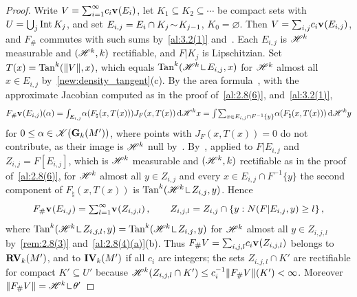 \begin{proof}
    Write $V = {\textstyle\sum_{i=1}^{\infty}} c_i \mathbf{v}_{}(E_i)$, let $K_1 \subseteq K_2 \subseteq \cdots$
    be compact sets with $U = {{\textstyle \bigcup}}_j \operatorname{Int} K_j$, and set $E_{i,j} = E_i \cap K_j \!\sim\!
    K_{j-1}$, $K_0 = \varnothing$. Then $V = {\textstyle\sum_{i,j}^{}} c_i \mathbf{v}_{}(E_{i,j})$, and $F_\#$
    commutes with such sums by~\ref{al:3.2(1)} and~\cite[2.4.7]{Federer1969}. Each $E_{i,j}$ is
    $\mathscr{H}^{k}$ measurable and $(\mathscr{H}^{k},k)$ rectifiable, and $F | K_j$ is Lipschitzian.
    Set $T(x) = \operatorname{Tan}^{k}(\|V\|,x)$, which equals $\Tan^{\vdim}(\HM^{\vdim} \restrict E_{i,j},x)$
    for $\mathscr{H}^{k}$ almost all $x \in E_{i,j}$ by~\ref{new:density_tangent}(c). By the area
    formula~\cite[3.2.20]{Federer1969}, with the approximate Jacobian computed as in the proof
    of~\ref{al:2.8(6)}, and~\ref{al:3.2(1)},
    \begin{displaymath}
        F_\# \mathbf{v}_{}(E_{i,j})(\alpha) = {\textstyle\int_{E_{i,j}}^{}} \alpha(F_\natural(x,T(x))) J_F(x,T(x))
        \,\mathrm{d} \mathscr{H}^{k} x = {\textstyle\int_{}^{}} {\textstyle\sum_{x \in E_{i,j} \cap F^{-1}\{y\}}^{}} \alpha(F_\natural(x,
        T(x))) \,\mathrm{d} \mathscr{H}^{k} y
    \end{displaymath}
    for $0 \le \alpha \in \mathscr{K}(\mathbf{G}_{k}(M'))$, where points with $J_F(x,T(x)) = 0$ do not
    contribute, as their image is $\mathscr{H}^{k}$ null by~\cite[3.2.20]{Federer1969}.
    By~\cite[3.2.22(1)]{Federer1969}, applied to $F | E_{i,j}$ and $Z_{i,j} = F[E_{i,j}]$, which
    is $\mathscr{H}^{k}$ measurable and $(\mathscr{H}^{k},k)$ rectifiable as in the proof
    of~\ref{al:2.8(6)}, for $\mathscr{H}^{k}$ almost all $y \in Z_{i,j}$ and every $x \in E_{i,j}
    \cap F^{-1}\{y\}$ the second component of $F_\natural(x,T(x))$ is $\Tan^{\vdim}(\HM^{\vdim}
    \restrict Z_{i,j}, y)$. Hence
    \begin{displaymath}
        F_\# \mathbf{v}_{}(E_{i,j}) = {\textstyle\sum_{l=1}^{\infty}} \mathbf{v}_{}(Z_{i,j,l}) \,, \qquad Z_{i,j,l} =
        Z_{i,j} \cap \{ y : N(F | E_{i,j}, y) \ge l \} \,,
    \end{displaymath}
    where $\Tan^{\vdim}(\HM^{\vdim} \restrict Z_{i,j,l}, y) = \Tan^{\vdim}(\HM^{\vdim} \restrict
    Z_{i,j}, y)$ for $\mathscr{H}^{k}$ almost all $y \in Z_{i,j,l}$ by~\ref{rem:2.8(3)}
    and~\ref{al:2.8(4)(a)}(b). Thus $F_\# V = {\textstyle\sum_{i,j,l}^{}} c_i \mathbf{v}_{}(Z_{i,j,l})$ belongs to
    $\mathbf{RV}_{k}(M')$, and to $\mathbf{IV}_{k}(M')$ if all $c_i$ are integers; the sets $Z_{i,j,l}
    \cap K'$ are rectifiable for compact $K' \subseteq U'$ because $\mathscr{H}^{k}(Z_{i,j,l} \cap K')
    \le c_i^{-1} \|F_\# V\|(K') < \infty$. Moreover $\|F_\# V\| = \HM^{\vdim} \restrict \theta'$

\end{proof}
